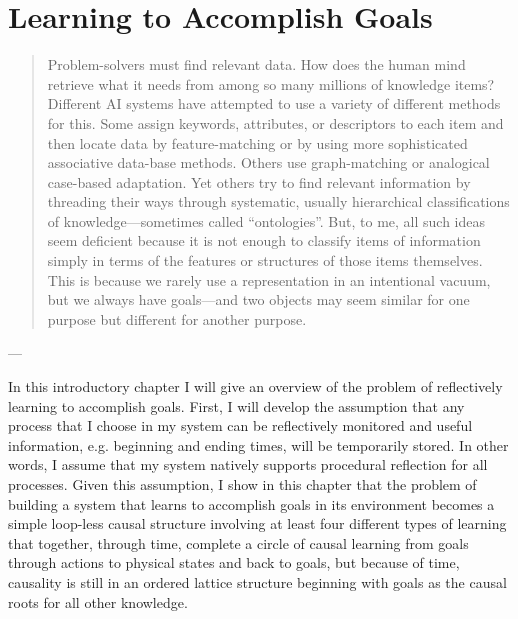 \chapter{Learning to Accomplish Goals}\label{ch:learning_to_accomplish_goals}

\begin{quote}
  Problem-solvers must find relevant data.  How does the human mind
  retrieve what it needs from among so many millions of knowledge items?
  Different AI systems have attempted to use a variety of different
  methods for this.  Some assign keywords, attributes, or descriptors to
  each item and then locate data by feature-matching or by using more
  sophisticated associative data-base methods.  Others use
  graph-matching or analogical case-based adaptation.  Yet others try to
  find relevant information by threading their ways through systematic,
  usually hierarchical classifications of knowledge---sometimes called
  ``ontologies''.  But, to me, all such ideas seem deficient because it
  is not enough to classify items of information simply in terms of the
  features or structures of those items themselves.  This is because we
  rarely use a representation in an intentional vacuum, but we always
  have goals---and two objects may seem similar for one purpose but
  different for another purpose.
\end{quote}
\begin{flushright}
  --- 
\end{flushright}

In this introductory chapter I will give an overview of the problem of
reflectively learning to accomplish goals.  First, I will develop the
assumption that any process that I choose in my system can be
reflectively monitored and useful information, e.g. beginning and
ending times, will be temporarily stored.  In other words, I assume
that my system natively supports procedural reflection for all
processes.  Given this assumption, I show in this chapter that the
problem of building a system that learns to accomplish goals in its
environment becomes a simple loop-less causal structure involving at
least four different types of learning that together, through time,
complete a circle of causal learning from goals through actions to
physical states and back to goals, but because of time, causality is
still in an ordered lattice structure beginning with goals as the
causal roots for all other knowledge.

